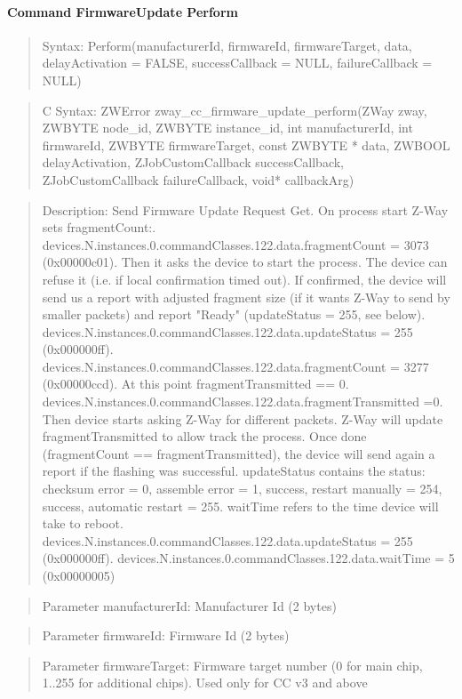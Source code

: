 \paragraph{Command FirmwareUpdate Perform}
\begin{quote}Syntax: Perform(manufacturerId, firmwareId, firmwareTarget, data, delayActivation = FALSE, successCallback = NULL, failureCallback = NULL)\end{quote}
\begin{quote}C Syntax: ZWError zway\_cc\_firmware\_update\_perform(ZWay zway, ZWBYTE node\_id, ZWBYTE instance\_id, int manufacturerId, int firmwareId, ZWBYTE firmwareTarget, const ZWBYTE * data, ZWBOOL delayActivation, ZJobCustomCallback successCallback, ZJobCustomCallback failureCallback, void* callbackArg)\end{quote}
\begin{quote}Description: Send Firmware Update Request Get. On process start Z-Way sets fragmentCount:. devices.N.instances.0.commandClasses.122.data.fragmentCount = 3073 (0x00000c01). Then it asks the device to start the process. The device can refuse it (i.e. if local confirmation timed out). If confirmed, the device will send us a report with adjusted fragment size (if it wants Z-Way to send by smaller packets) and report "Ready" (updateStatus = 255, see below). devices.N.instances.0.commandClasses.122.data.updateStatus = 255 (0x000000ff). devices.N.instances.0.commandClasses.122.data.fragmentCount = 3277 (0x00000ccd). At this point fragmentTransmitted == 0. devices.N.instances.0.commandClasses.122.data.fragmentTransmitted =0. Then device starts asking Z-Way for different packets. Z-Way will update fragmentTransmitted to allow track the process. Once done (fragmentCount == fragmentTransmitted), the device will send again a report if the flashing was successful. updateStatus contains the status: checksum error = 0, assemble error = 1, success, restart manually = 254, success, automatic restart = 255. waitTime refers to the time device will take to reboot. devices.N.instances.0.commandClasses.122.data.updateStatus = 255 (0x000000ff). devices.N.instances.0.commandClasses.122.data.waitTime = 5 (0x00000005)\end{quote}
\begin{quote}Parameter manufacturerId: Manufacturer Id (2 bytes)\end{quote}
\begin{quote}Parameter firmwareId: Firmware Id (2 bytes)\end{quote}
\begin{quote}Parameter firmwareTarget: Firmware target number (0 for main chip, 1..255 for additional chips). Used only for CC v3 and above\end{quote}
